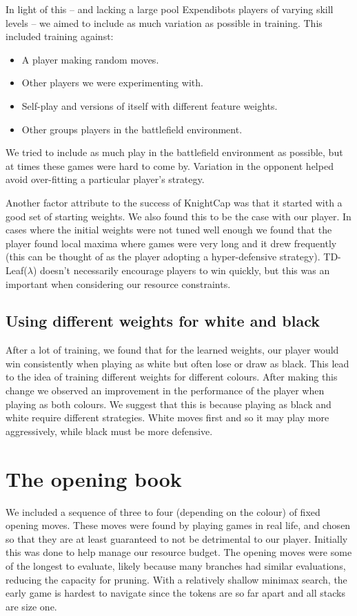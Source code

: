 \documentclass[11pt]{article}
\begin{document}
In light of this -- and lacking a large pool Expendibots players of varying skill levels -- we aimed to include as much variation as possible in training. This included training against:
\begin{itemize}
    \item A player making random moves.
    \item Other players we were experimenting with.
    \item Self-play and versions of itself with different feature weights.
    \item Other groups players in the battlefield environment.
\end{itemize}
We tried to include as much play in the battlefield environment as possible, but at times these games were hard to come by. Variation in the opponent helped avoid over-fitting a particular player's strategy.

Another factor \cite{baxter_tdleaflambda_1999} attribute to the success of KnightCap was that it started with a good set of starting weights. We also found this to be the case with our player. In cases where the initial weights were not tuned well enough we found that the player found local maxima where games were very long and it drew frequently (this can be thought of as the player adopting a hyper-defensive strategy). TD-Leaf($\lambda$) doesn't necessarily encourage players to win quickly, but this was an important when considering our resource constraints.

\subsection{Using different weights for white and black}
After a lot of training, we found that for the learned weights, our player would win consistently when playing as white but often lose or draw as black. This lead to the idea of training different weights for different colours. After making this change we observed an improvement in the performance of the player when playing as both colours. We suggest that this is because playing as black and white require different strategies. White moves first and so it may play more aggressively, while black must be more defensive.

\section{The opening book} \label{sec:opening-book}
We included a sequence of three to four (depending on the colour) of fixed opening moves. These moves were found by playing games in real life, and chosen so that they are at least guaranteed to not be detrimental to our player. Initially this was done to help manage our resource budget. The opening moves were some of the longest to evaluate, likely because many branches had similar evaluations, reducing the capacity for pruning. With a relatively shallow minimax search, the early game is hardest to navigate since the tokens are so far apart and all stacks are size one.
\end{document}
